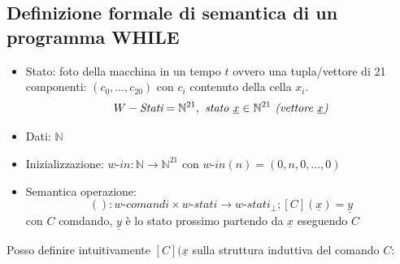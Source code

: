 \documentclass{article}
\begin{document}
\subsection{Definizione formale di semantica di un programma WHILE}
\begin{itemize}

\item Stato: foto della macchina in un tempo $t$ ovvero una tupla/vettore di 21 componenti: $(c_0, \dots, c_{20})$ con $c_i$ contenuto della cella $x_i$.
\begin{displaymath}
	W-\textit{Stati}=\mathbb{N}^{21}, \textit{ stato } \underline{x} \in \mathbb{N}^{21} \textit{ (vettore \underline{$x$})}
\end{displaymath}
\item Dati: $\mathbb{N}$
\item Inizializzazione: $w\textit{-in}: \mathbb{N} \rightarrow \mathbb{N}^{21}$ con $w\textit{-in}(n)=(0,n,0,\dots,0)$
\item Semantica operazione: \begin{displaymath}
		[](): w\textit{-comandi} \times w\textit{-stati} \rightarrow w\textit{-stati}_{\perp} 
		; [C](\underline{x})=\underline{y}
\end{displaymath} 
con $C$ comdando, $\underline{y}$ è lo stato prossimo partendo da $\underline{x}$ eseguendo $C$
\end{itemize}
Posso definire intuitivamente $[C](\underline{x}$ sulla struttura induttiva del comando $C$:
\end{document}
